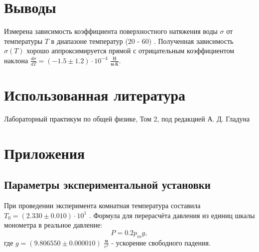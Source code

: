 \documentclass[a4paper,12pt]{report}
\begin{document}
\begin{multicols}{2}
\section{Выводы}
Измерена зависимость коэффициента поверхностного натяжения воды $\sigma$ от температуры $T$ в диапазоне 
температур (20 - 60) \textcelsius. Полученная зависимость $\sigma(T)$ хорошо аппроксимируется прямой 
с отрицательным коэффициентом наклона $\frac{d \sigma }{d T} = (-1.5 \pm 1.2) \cdot 10 ^ {-4}$ $\frac{\text{Н}}{\text{м}\cdot\text{К}}$.    

\section{Использованная литература}
\begin{thebibliography}{9}
    Лабораторный практикум по общей физике, Том 2, под редакцией А. Д. Гладуна
\end{thebibliography}

\end{multicols}

\section{Приложения}
\subsection{Параметры экспериментальной установки} \label{app_1}
При проведении эксперимента комнатная температура составила $T_0 = (2.330 \pm 0.010) \cdot 10 ^ {1}$ \textcelsius. 
Формула для перерасчёта давления из единиц шкалы монометра в реальное давление:
\[
    P = 0.2 p_m g,
\]
где $g = (9.806550 \pm 0.000010)$ $\frac{\text{м}}{\text{c}^2}$  - ускорение свободного падения. 
\end{document}
